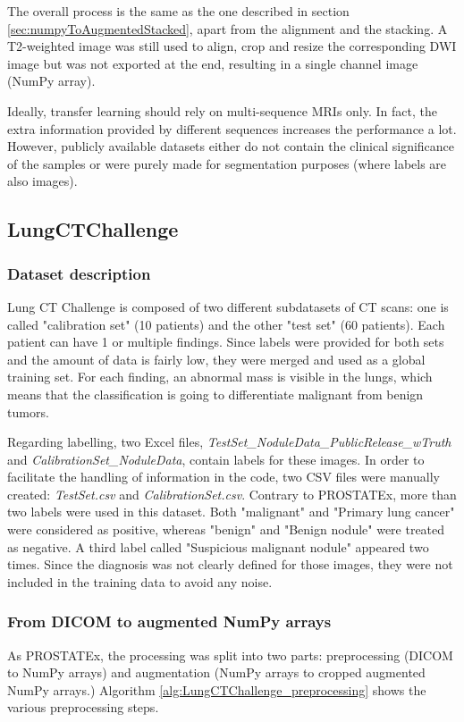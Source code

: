 The overall process is the same as the one described in section \ref{sec:numpyToAugmentedStacked}, apart from the alignment and the stacking. A T2-weighted image was still used to align, crop and resize the corresponding DWI image but was not exported at the end, resulting in a single channel image (NumPy array).

Ideally, transfer learning should rely on multi-sequence MRIs only. In fact, the extra information provided by different sequences increases the performance a lot. However, publicly available datasets either do not contain the clinical significance of the samples or were purely made for segmentation purposes (where labels are also images). 


\subsection{LungCTChallenge}
\label{sec:lungCTChallenge}
\subsubsection{Dataset description}
Lung CT Challenge is composed of two different subdatasets of CT scans: one is called "calibration set" (10 patients) and the other "test set" (60 patients). Each patient can have 1 or multiple findings. Since labels were provided for both sets and the amount of data is fairly low, they were merged and used as a global training set. For each finding, an abnormal mass is visible in the lungs, which means that the classification is going to differentiate malignant from benign tumors. 

Regarding labelling, two Excel files, \textit{TestSet\_NoduleData\_PublicRelease\_wTruth} and \textit{CalibrationSet\_NoduleData}, contain labels for these images. In order to facilitate the handling of information in the code, two CSV files were manually created: \mbox{\textit{TestSet.csv}} and \textit{CalibrationSet.csv}.
Contrary to PROSTATEx, more than two labels were used in this dataset. Both "malignant" and "Primary lung cancer" were considered as positive, whereas "benign" and "Benign nodule" were treated as negative. A third label called "Suspicious malignant nodule" appeared two times. Since the diagnosis was not clearly defined for those images, they were not included in the training data to avoid any noise. 


\subsubsection{From DICOM to augmented NumPy arrays}
As PROSTATEx, the processing was split into two parts: preprocessing (DICOM to NumPy arrays) and augmentation (NumPy arrays to cropped augmented NumPy arrays.) Algorithm \ref{alg:LungCTChallenge_preprocessing} shows the various preprocessing steps. 

